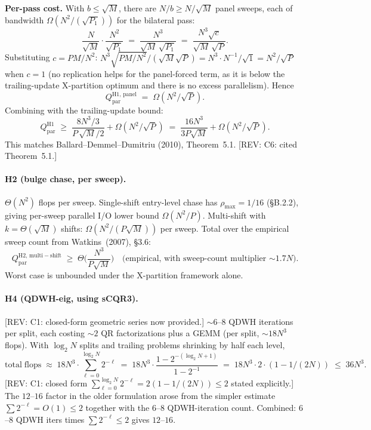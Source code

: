 \documentclass[11pt]{article}
\newcommand{\REV}[1]{\textcolor{blue!60!black}{\small\textsf{[REV: #1]}}}
\begin{document}
\textbf{Per-pass cost.}
With $b \le \sqrt{M}$, there are $N/b \ge N/\sqrt{M}$ panel sweeps,
each of bandwidth $\Omega(N^2/(\sqrt{P_1}))$ for the bilateral pass:
\[
  \frac{N}{\sqrt{M}}\cdot\frac{N^2}{\sqrt{P_1}}
  \;=\; \frac{N^3}{\sqrt{M}\,\sqrt{P_1}}
  \;=\; \frac{N^3 \sqrt{c}}{\sqrt{M}\,\sqrt{P}}.
\]
Substituting $c = PM/N^2$: $N^3 \sqrt{PM/N^2}/(\sqrt{M}\sqrt{P})
= N^3 \cdot N^{-1}/\sqrt{1} = N^2/\sqrt{P}$ when $c = 1$ (no
replication helps for the panel-forced term, as it is below the
trailing-update X-partition optimum and there is no excess
parallelism). Hence
\[
  Q_{\mathrm{par}}^{\mathrm{H1,\,panel}} \;=\; \Omega(N^2/\sqrt{P}).
\]
Combining with the trailing-update bound:
\[
  Q_{\mathrm{par}}^{\mathrm{H1}}
  \;\ge\; \frac{8 N^3 / 3}{P\,\sqrt{M}/2}
        + \Omega(N^2/\sqrt{P})
  \;=\; \frac{16 N^3}{3 P\sqrt{M}} + \Omega(N^2/\sqrt{P}).
\]
This matches Ballard--Demmel--Dumitriu (2010), Theorem~5.1.
\REV{C6: cited Theorem~5.1.}

\paragraph{H2 (bulge chase, per sweep).}
$\Theta(N^2)$ flops per sweep. Single-shift entry-level chase has
$\rho_{\max} = 1/16$ (\S B.2.2), giving per-sweep parallel I/O lower
bound $\Omega(N^2/P)$. Multi-shift with $k = \Theta(\sqrt{M})$ shifts:
$\Omega(N^2/(P\sqrt{M}))$ per sweep. Total over the empirical sweep
count from Watkins~(2007), \S 3.6:
\[
  Q_{\mathrm{par}}^{\mathrm{H2,\,multi-shift}}
  \;\ge\; \Theta\!\Big(\frac{N^3}{P\sqrt{M}}\Big)
  \quad\text{(empirical, with sweep-count multiplier $\sim 1.7N$).}
\]
Worst case is unbounded under the X-partition framework alone.

\paragraph{H4 (QDWH-eig, using sCQR3).}
\REV{C1: closed-form geometric series now provided.}
$\sim 6$--$8$ QDWH iterations per split, each costing $\sim 2$ QR
factorizations plus a GEMM (per split, $\sim 18 N^3$ flops). With
$\log_2 N$ splits and trailing problems shrinking by half each level,
\[
  \mathrm{total\;flops}
  \;\approx\; 18 N^3 \cdot \sum_{\ell=0}^{\log_2 N} 2^{-\ell}
  \;=\; 18 N^3 \cdot \frac{1 - 2^{-(\log_2 N + 1)}}{1 - 2^{-1}}
  \;=\; 18 N^3 \cdot 2\cdot(1 - 1/(2N))
  \;\le\; 36 N^3.
\]
\REV{C1: closed form $\sum_{\ell=0}^{\log_2 N} 2^{-\ell}
= 2(1 - 1/(2N)) \le 2$ stated explicitly.}
The $12$--$16$ factor in the older formulation arose from the simpler
estimate $\sum 2^{-\ell} = O(1) \le 2$ together with the $6$--$8$
QDWH-iteration count. Combined: $6$--$8$ QDWH iters times
$\sum 2^{-\ell} \le 2$ gives $12$--$16$.
\end{document}
